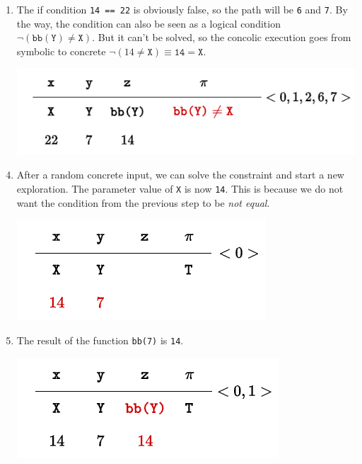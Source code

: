 \begin{examplebox}
\begin{enumerate}
        \item The if condition \texttt{14 == 22} is obviously false, so the path will be \texttt{6} and \texttt{7}. By the way, the condition can also be seen as a logical condition $\lnot \left(\texttt{bb}\left(\texttt{Y}\right) \ne \texttt{X}\right)$. But it can't be solved, so the concolic execution goes from symbolic to concrete $\lnot \left(14 \ne \texttt{X}\right) \equiv \texttt{14} = \texttt{X}$.
        \begin{center}
            \includegraphics[width=.7\textwidth]{img/concolic-execution-3.pdf}
        \end{center}
    \end{enumerate}

    \longline

    \begin{enumerate}
        \setcounter{enumi}{3}
        \item After a random concrete input, we can solve the constraint and start a new exploration. The parameter value of \texttt{X} is now \texttt{14}. This is because we do not want the condition from the previous step to be \emph{not equal}.
        \begin{center}
            \includegraphics[width=.5\textwidth]{img/concolic-execution-4.pdf}
        \end{center}

        \item The result of the function \texttt{bb(7)} is \texttt{14}.
        \begin{center}
            \includegraphics[width=.5\textwidth]{img/concolic-execution-5.pdf}
        \end{center}


\end{enumerate}
\end{examplebox}
